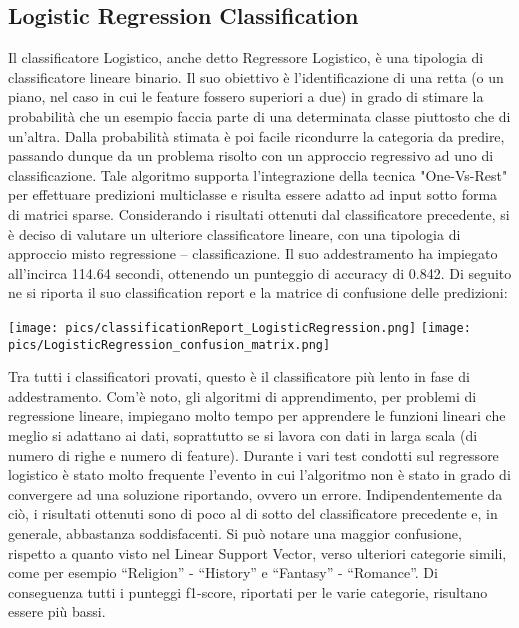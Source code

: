 \documentclass[12pt,oneside]{article}
\begin{document}
    \begin{enumerate}
    
    \subsection{Logistic Regression Classification}
    \begin{justify}
    Il classificatore Logistico, anche detto Regressore Logistico, è una tipologia di classificatore lineare binario. Il suo obiettivo è l’identificazione di una retta (o un piano, nel caso in cui le feature fossero superiori a due) in grado di stimare la probabilità che un esempio faccia parte di una determinata classe piuttosto che di un’altra. Dalla probabilità stimata è poi facile ricondurre la categoria da predire, passando dunque da un problema risolto con un approccio regressivo ad uno di classificazione. Tale algoritmo supporta l’integrazione della tecnica "One-Vs-Rest" per effettuare predizioni multiclasse e risulta essere adatto ad input sotto forma di matrici sparse. Considerando i risultati ottenuti dal classificatore precedente, si è deciso di valutare un ulteriore classificatore lineare, con una tipologia di approccio misto regressione – classificazione.
    Il suo addestramento ha impiegato all’incirca 114.64 secondi, ottenendo un punteggio di accuracy di 0.842. 
    Di seguito ne si riporta il suo classification report e la matrice di confusione delle predizioni:
    \end{justify}

    \centering
    \texttt{[image: pics/classificationReport\_LogisticRegression.png]}
    \texttt{[image: pics/LogisticRegression\_confusion\_matrix.png]}

    \begin{justify}
    Tra tutti i classificatori provati, questo è il classificatore più lento in fase di addestramento. Com’è noto, gli algoritmi di apprendimento, per problemi di regressione lineare, impiegano molto tempo per apprendere le funzioni lineari che meglio si adattano ai dati, soprattutto se si lavora con dati in larga scala (di numero di righe e numero di feature). Durante i vari test condotti sul regressore logistico è stato molto frequente l'evento in cui l’algoritmo non è stato in grado di convergere ad una soluzione riportando, ovvero un errore. Indipendentemente da ciò, i risultati ottenuti sono di poco al di sotto del classificatore precedente e, in generale, abbastanza soddisfacenti. Si può notare una maggior confusione, rispetto a quanto visto nel Linear Support Vector, verso ulteriori categorie simili, come per esempio “Religion” - “History” e “Fantasy” - “Romance”. Di conseguenza tutti i punteggi f1-score, riportati per le varie categorie, risultano essere più bassi. 
    \end{justify}
    \end{enumerate}
\end{document}
